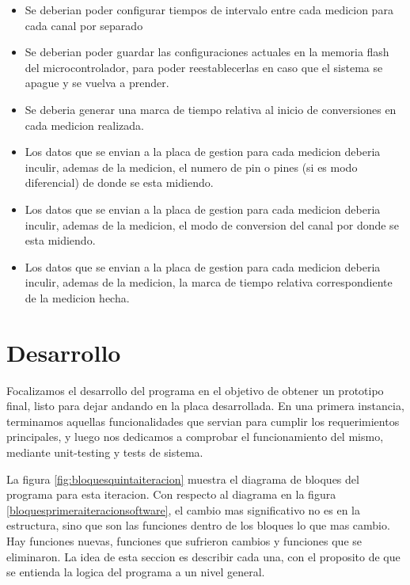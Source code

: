 \begin{itemize}
\item Se deberian poder configurar tiempos de intervalo entre cada medicion para cada canal por separado
\item Se deberian poder guardar las configuraciones actuales en la memoria flash del microcontrolador, para poder reestablecerlas en caso que el sistema se apague y se vuelva a prender.
\item Se deberia generar una marca de tiempo relativa al inicio de conversiones en cada medicion realizada.
\item Los datos que se envian a la placa de gestion para cada medicion deberia inculir, ademas de la medicion, el numero de pin o pines (si es modo diferencial) de donde se esta midiendo. 
\item Los datos que se envian a la placa de gestion para cada medicion deberia inculir, ademas de la medicion, el modo de conversion del canal por donde se esta midiendo.
\item Los datos que se envian a la placa de gestion para cada medicion deberia inculir, ademas de la medicion, la marca de tiempo relativa correspondiente de la medicion hecha. 
\end{itemize}



\section{Desarrollo} %
\label{it5:sec:desarrollo}

Focalizamos el desarrollo del programa en el objetivo de obtener un prototipo final, listo para dejar andando en la placa desarrollada. En una primera instancia, terminamos aquellas funcionalidades que servian para cumplir los requerimientos principales, y luego nos dedicamos a comprobar el funcionamiento del mismo, mediante unit-testing y tests de sistema.

La figura \ref{fig:bloquesquintaiteracion} muestra el diagrama de bloques del programa para esta iteracion. Con respecto al diagrama en la figura \ref{bloquesprimeraiteracionsoftware}, el cambio mas significativo no es en la estructura, sino que son las funciones dentro de los bloques lo que mas cambio. Hay funciones nuevas, funciones que sufrieron cambios y funciones que se eliminaron. La idea de esta seccion es describir cada una, con el proposito de que se entienda la logica del programa a un nivel general.

